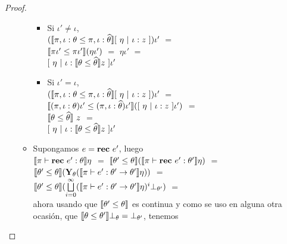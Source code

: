 \begin{proof}
\begin{itemize}
\begin{itemize}
\begin{itemize}
\item Si $\iota' \neq \iota$, \\

$(\llbracket \pi,\iota:\theta \leq \pi,\iota:\widehat{\theta} \rrbracket[ \ \eta \ | \ \iota:z \ ])\iota'$ $=$\\
$\llbracket \pi\iota' \leq \pi\iota' \rrbracket(\eta\iota')$ $=$
$\eta\iota'$ $=$\\
$[ \ \eta \ | \ \iota:\llbracket \theta \leq \widehat{\theta} \rrbracket z \ ]\iota'$

\item Si $\iota' = \iota$, \\

$(\llbracket \pi,\iota:\theta \leq \pi,\iota:\widehat{\theta} \rrbracket[ \ \eta \ | \ \iota:z \ ])\iota'$ $=$\\
$\semBrcks{(\pi,\iota:\theta)\iota' \leq (\pi,\iota:\thetahat)\iota'}
											([ \ \eta \ | \ \iota:z \ ]\iota')$ $=$\\
$\llbracket \theta \leq \widehat{\theta} \rrbracket \ z$ $=$\\
$[ \ \eta \ | \ \iota:\llbracket \theta \leq \widehat{\theta} \rrbracket z \ ]\iota'$

\end{itemize}

\item Supongamos $e = \textbf{rec} \ e'$, luego \\

$\llbracket \pi \vdash \textbf{rec} \ e' : \theta \rrbracket \eta$ $=$ 
$\llbracket \theta' \leq \theta \rrbracket (\llbracket \pi \vdash \textbf{rec} \ e' : \theta' \rrbracket \eta)$ $=$\\
$\llbracket \theta' \leq \theta \rrbracket 
	(\textbf{Y}_{\theta} (\llbracket \pi \vdash e' : \theta' \rightarrow \theta' \rrbracket\eta))$ $=$\\
$\llbracket \theta' \leq \theta \rrbracket 
	(\bigsqcup\limits^{\infty}_{i=0} 
	(\llbracket \pi \vdash e' : \theta' \rightarrow \theta' \rrbracket\eta)^{i} \bot_{\theta'})$ $=$\\
	
ahora usando que $\llbracket \theta' \leq \theta \rrbracket$ es continua y como se uso en
alguna otra ocasi\'on, que $\llbracket \theta \leq \theta' \rrbracket \bot_{\theta} = \bot_{\theta'}$,
tenemos\\

\newpage


\end{itemize}
\end{itemize}
\end{proof}
